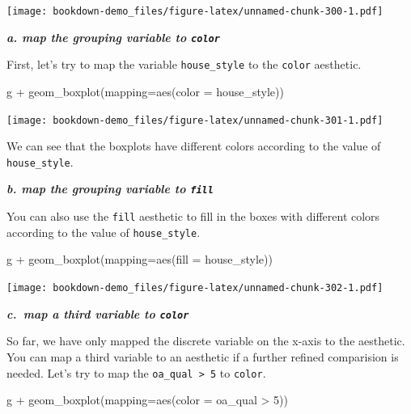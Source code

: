 \documentclass[
]{book}
\newenvironment{Shaded}{\begin{snugshade}}{\end{snugshade}}
\newcommand{\AttributeTok}[1]{\textcolor[rgb]{0.77,0.63,0.00}{#1}}
\newcommand{\DecValTok}[1]{\textcolor[rgb]{0.00,0.00,0.81}{#1}}
\newcommand{\FunctionTok}[1]{\textcolor[rgb]{0.00,0.00,0.00}{#1}}
\newcommand{\NormalTok}[1]{#1}
\newcommand{\SpecialCharTok}[1]{\textcolor[rgb]{0.00,0.00,0.00}{#1}}
\begin{document}
\texttt{[image: bookdown-demo\_files/figure-latex/unnamed-chunk-300-1.pdf]}

\textbf{\emph{a. map the grouping variable to \texttt{color}}}

First, let's try to map the variable \texttt{house\_style} to the \texttt{color} aesthetic.

\begin{Shaded}
\begin{Highlighting}[]
\NormalTok{g }\SpecialCharTok{+} \FunctionTok{geom\_boxplot}\NormalTok{(}\AttributeTok{mapping=}\FunctionTok{aes}\NormalTok{(}\AttributeTok{color =}\NormalTok{ house\_style))}
\end{Highlighting}
\end{Shaded}

\texttt{[image: bookdown-demo\_files/figure-latex/unnamed-chunk-301-1.pdf]}

We can see that the boxplots have different colors according to the value of \texttt{house\_style}.

\textbf{\emph{b. map the grouping variable to \texttt{fill}}}

You can also use the \texttt{fill} aesthetic to fill in the boxes with different colors according to the value of \texttt{house\_style}.

\begin{Shaded}
\begin{Highlighting}[]
\NormalTok{g }\SpecialCharTok{+} \FunctionTok{geom\_boxplot}\NormalTok{(}\AttributeTok{mapping=}\FunctionTok{aes}\NormalTok{(}\AttributeTok{fill =}\NormalTok{ house\_style))}
\end{Highlighting}
\end{Shaded}

\texttt{[image: bookdown-demo\_files/figure-latex/unnamed-chunk-302-1.pdf]}

\textbf{\emph{c.~map a third variable to \texttt{color}}}

So far, we have only mapped the discrete variable on the x-axis to the aesthetic. You can map a third variable to an aesthetic if a further refined comparision is needed. Let's try to map the \texttt{oa\_qual\ \textgreater{}\ 5} to \texttt{color}.

\begin{Shaded}
\begin{Highlighting}[]
\NormalTok{g }\SpecialCharTok{+} \FunctionTok{geom\_boxplot}\NormalTok{(}\AttributeTok{mapping=}\FunctionTok{aes}\NormalTok{(}\AttributeTok{color =}\NormalTok{ oa\_qual }\SpecialCharTok{\textgreater{}} \DecValTok{5}\NormalTok{))}
\end{Highlighting}
\end{Shaded}
\end{document}
